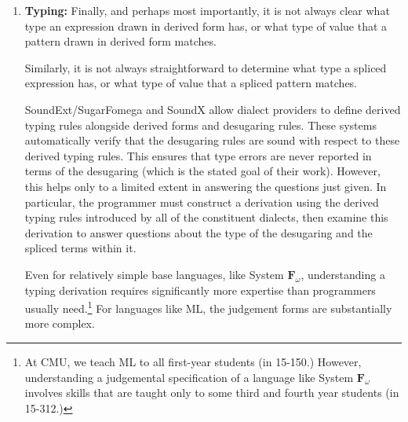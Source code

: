 {\begin{enumerate}
To enforce context independence, the system must be aware of binding structure and have some way to distinguish those subterms of a desugaring that originate in the text at the use site (which should have access to bindings at the use site) from those that do not (which should only have access to bindings internal to the desugaring.) 
For example, language-integrated mixfix systems, e.g. Coq's notation system, use a simple rewriting system to compute desugarings, so they satisfy these requirements and can enforce context independence. Coq gives desugarings access only to the bindings visible where the notation was defined.

More flexible systems where desugarings are computed functionally, or language-external systems that have no understanding of binding structure, do not enforce context independence.

\item \textbf{Typing:} Finally, and perhaps most importantly, it is not always clear what type an expression drawn in derived form has, or what type of value that a pattern drawn in derived form matches.

Similarly, it is not always straightforward to determine what type a spliced expression has, or what type of value that a spliced pattern matches.

SoundExt/SugarFomega \cite{conf/popl/LorenzenE16} and SoundX \cite{conf/sle/RitschelE15} allow dialect providers to define derived typing rules alongside derived forms and desugaring rules. These systems automatically verify that the desugaring rules are sound with respect to these derived typing rules. This ensures that type errors are never reported in terms of the desugaring (which is the stated goal of their work). However, this helps only to a limited extent in answering the questions just given. In particular, the programmer must construct a derivation using the derived typing rules introduced by all of the constituent dialects, then examine this derivation to answer questions about the type of the desugaring and the spliced terms within it. 

Even for relatively simple base languages, like System $\mathbf{F}_\omega$, understanding a typing derivation requires significantly more expertise than programmers usually need.\footnote{At CMU, we teach ML to all first-year students (in 15-150.) However, understanding a judgemental specification of a language like System $\mathbf{F}_\omega$ involves skills that are taught only to some third and fourth year students (in 15-312.)} For languages like ML, the judgement forms are substantially more complex. 
\end{enumerate}

}
